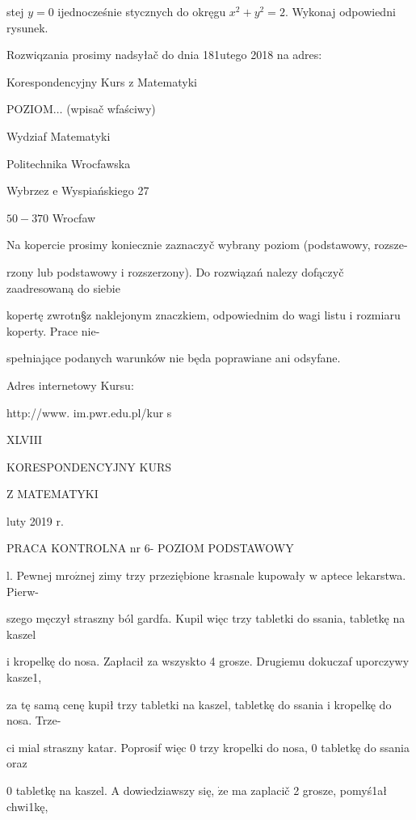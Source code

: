 \documentclass[a4paper,12pt]{article}
\begin{document}
stej $y=0$ ijednocześnie stycznych do okręgu $x^{2}+y^{2}=2$. Wykonaj odpowiedni rysunek.

Rozwiqzania prosimy nadsyłač do dnia 181utego 2018 na adres:

Korespondencyjny Kurs $\mathrm{z}$ Matematyki

POZIOM$\ldots$ (wpisač wfaściwy)

Wydziaf Matematyki

Politechnika Wrocfawska

Wybrzez $\mathrm{e}$ Wyspiańskiego 27

$50-370$ Wrocfaw

Na kopercie prosimy koniecznie zaznaczyč wybrany poziom (podstawowy, rozsze-

rzony lub podstawowy $\mathrm{i}$ rozszerzony). Do rozwiązań nalez$\mathrm{y}$ dofączyč zaadresowaną do siebie

kopertę zwrotn\S z naklejonym znaczkiem, odpowiednim do wagi listu $\mathrm{i}$ rozmiaru koperty. Prace nie-

spełniające podanych warunków nie będa poprawiane ani odsyfane.

Adres internetowy Kursu:

http://www. im.pwr.edu.pl/kur s







XLVIII

KORESPONDENCYJNY KURS

Z MATEMATYKI

luty 2019 r.

PRACA KONTROLNA nr 6- POZIOM PODSTAWOWY

l. Pewnej $\mathrm{m}\mathrm{r}\mathrm{o}\acute{\mathrm{z}}\mathrm{n}\mathrm{e}\mathrm{j}$ zimy trzy przeziębione krasnale kupowały $\mathrm{w}$ aptece lekarstwa. Pierw-

szego męczył straszny ból gardfa. Kupil więc trzy tabletki do ssania, tabletkę na kaszel

$\mathrm{i}$ kropelkę do nosa. Zapłacił za wszyskto 4 grosze. Drugiemu dokuczaf uporczywy kasze1,

za tę samą cenę kupił trzy tabletki na kaszel, tabletkę do ssania $\mathrm{i}$ kropelkę do nosa. Trze-

ci mial straszny katar. Poprosif więc $0$ trzy kropelki do nosa, $0$ tabletkę do ssania oraz

$0$ tabletkę na kaszel. A dowiedziawszy się, $\dot{\mathrm{z}}\mathrm{e}$ ma zaplacič 2 grosze, pomyś1ał chwi1kę,
\end{document}
